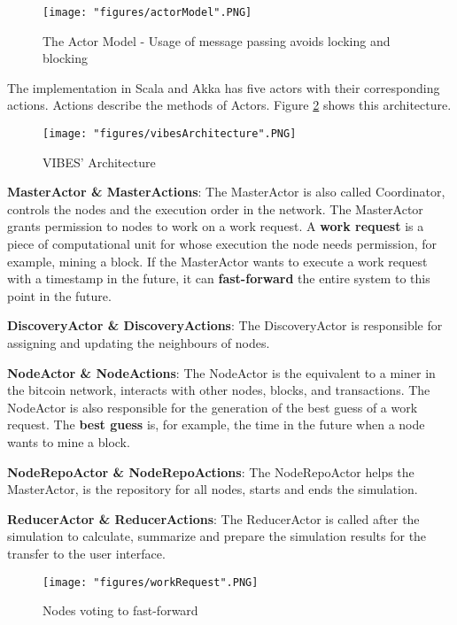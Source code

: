 \begin{figure}[!htb]
\centering
\texttt{[image: "figures/actorModel".PNG]}
\caption{The Actor Model - Usage of message passing avoids locking and blocking
\label{fig:bestGuess}}
\end{figure}

The implementation in Scala and Akka has five actors with their corresponding actions. Actions describe the methods of Actors. Figure \ref{fig:architecture} shows this architecture.

\begin{figure}[!htb]
\centering
\texttt{[image: "figures/vibesArchitecture".PNG]}
\caption{VIBES’ Architecture
\label{fig:architecture}}
\end{figure}

\textbf{MasterActor \& MasterActions}: The MasterActor is also called Coordinator, controls the nodes and the execution order in the network. The MasterActor grants permission to nodes to work on a work request. A \textbf{work request} is a piece of computational unit for whose execution the node needs permission, for example, mining a block. If the MasterActor wants to execute a work request with a timestamp in the future, it can \textbf{fast-forward} the entire system to this point in the future.

\textbf{DiscoveryActor \& DiscoveryActions}: The DiscoveryActor is responsible for assigning and updating the neighbours of nodes.

\textbf{NodeActor \& NodeActions}: The NodeActor is the equivalent to a miner in the bitcoin network, interacts with other nodes, blocks, and transactions. The NodeActor is also responsible for the generation of the best guess of a work request. The \textbf{best guess} is, for example, the time in the future when a node wants to mine a block.

\textbf{NodeRepoActor \& NodeRepoActions}: The NodeRepoActor helps the MasterActor, is the repository for all nodes, starts and ends the simulation.

\textbf{ReducerActor \& ReducerActions}: The ReducerActor is called after the simulation to calculate, summarize and prepare the simulation results for the transfer to the user interface.

\begin{figure}[!htb]
\centering
\texttt{[image: "figures/workRequest".PNG]}
\caption{Nodes voting to fast-forward
\label{fig:workRequests}}
\end{figure}


